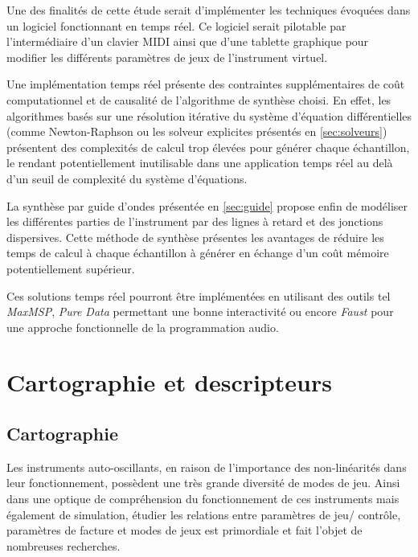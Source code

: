 \documentclass[atiam, article]{rapport} %
\begin{document}
Une des finalités de cette étude serait d'implémenter les techniques évoquées dans un logiciel fonctionnant en temps réel.
Ce logiciel serait pilotable par l'intermédiaire d'un clavier MIDI ainsi que d'une tablette graphique  pour modifier les différents paramètres de jeux de l'instrument virtuel.

Une implémentation temps réel présente des contraintes supplémentaires de coût computationnel et de causalité de l'algorithme de synthèse choisi. 
En effet, les algorithmes basés sur une résolution itérative du système d'équation différentielles (comme Newton-Raphson ou les solveur explicites présentés en \ref{sec:solveurs}) présentent des complexités de calcul trop élevées pour générer chaque échantillon, le rendant potentiellement inutilisable dans une application temps réel au delà d'un seuil de complexité du système d'équations.

La synthèse par guide d'ondes \cite{smith1987music} présentée en \ref{sec:guide} propose enfin de modéliser les différentes parties de l'instrument par des lignes à retard et des jonctions dispersives.
Cette méthode de synthèse présentes les avantages de réduire les temps de calcul à chaque échantillon à générer en échange d'un coût mémoire potentiellement supérieur.

Ces solutions temps réel pourront être implémentées en utilisant des outils tel \textit{MaxMSP}, \textit{Pure Data} permettant une bonne interactivité ou encore \textit{Faust} pour une approche fonctionnelle de la programmation audio.

\section{Cartographie et descripteurs}
\subsection{Cartographie}
Les instruments auto-oscillants, en raison de l'importance des non-linéarités dans leur fonctionnement, possèdent une très grande diversité de modes de jeu. Ainsi dans une optique de compréhension du fonctionnement de ces instruments mais également de simulation, étudier les relations entre paramètres de jeu/ contrôle, paramètres de facture et modes de jeux est primordiale et fait l'objet de nombreuses recherches. 
\end{document}
